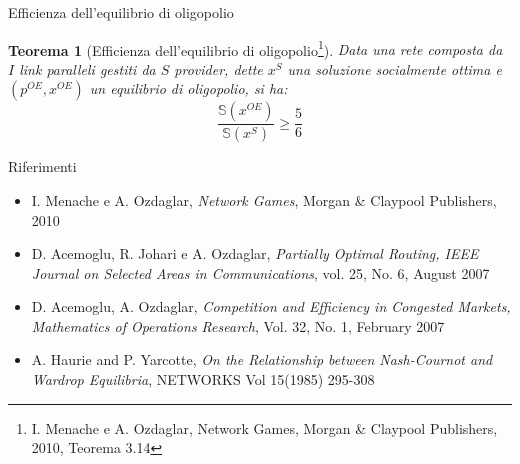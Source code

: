 \documentclass{beamer}
\newcounter{counter1}
\theoremstyle{plain}
\newtheorem{myteo}[counter1]{Teorema}
\theoremstyle{definition}
\theoremstyle{remark}
\newcommand{\pa}[1]{\left(#1\right)}
\begin{document}
\begin{frame}{Efficienza dell'equilibrio di oligopolio}
  \begin{myteo}[Efficienza dell'equilibrio di
    oligopolio\footnote{I. Menache e A. Ozdaglar, Network Games,
      Morgan \& Claypool Publishers, 2010, Teorema 3.14}]
    Data una rete composta da $I$ link paralleli gestiti da $S$
    provider, dette $x^{S}$ una soluzione socialmente ottima e
    $\pa{p^{OE},x^{OE}}$ un equilibrio di oligopolio, si ha:
    \[ \frac{\mathbb{S}\pa{x^{OE}}} {\mathbb{S}\pa{x^S}} \ge
      \frac{5}{6} \]
  \end{myteo}
\end{frame}

\begin{frame}{Riferimenti}
  \begin{itemize}
  \item I. Menache e A. Ozdaglar, \textit{Network Games}, Morgan \&
    Claypool Publishers, 2010
  \item D. Acemoglu, R. Johari e A. Ozdaglar, \textit{Partially
      Optimal Routing, IEEE Journal on Selected Areas in
      Communications}, vol. 25, No. 6, August 2007
  \item D. Acemoglu, A. Ozdaglar, \textit{Competition and Efficiency
      in Congested Markets, Mathematics of Operations Research},
    Vol. 32, No. 1, February 2007
  \item A. Haurie and P. Yarcotte, \textit{On the Relationship between
      Nash-Cournot and Wardrop Equilibria}, NETWORKS Vol 15(1985)
    295-308
  \end{itemize}
\end{frame}
\end{document}
